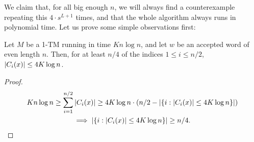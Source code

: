 We claim that, for all big enough $n$, we will always find a counterexample repeating this $4 \cdot s^{L+1}$ times,
and that the whole algorithm always runs in polynomial time. Let us prove some simple observations first:



\begin{lemma}
\label{lem:averageseqlength}
    Let $M$ be a 1-TM running in time $K n \log n$, and let $w$ be an accepted word of even length $n$. Then, for at least 
    $n/4$ of the indices $1 \leq i \leq n/2$, $|C_i(x)| \leq 4K \log n$. 
\end{lemma}
\begin{proof}
\begin{multline*}
K n \log n \geq \sum_{i=1}^{n/2} |C_i(x)| \geq 4K \log n \cdot \left(n/2 - |\{i : |C_i(x)| \leq 4K \log n\}|\right) \\ \implies  |\{i : |C_i(x)| \leq 4K \log n\}| \geq n/4.
\end{multline*}
\end{proof}

